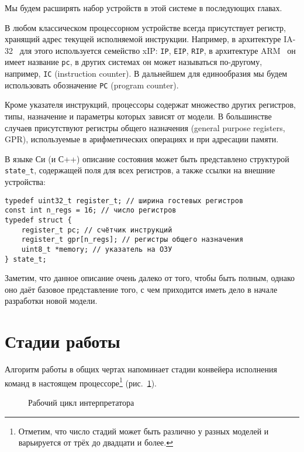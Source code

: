 Мы будем расширять набор устройств в этой системе в последующих главах.

В любом классическом процессорном устройстве всегда присутствует регистр, хранящий адрес текущей исполняемой инструкции. Например, в архитектуре IA-32~\cite{intelmanual2a} для этого используется семейство xIP: \texttt{IP}, \texttt{EIP}, \texttt{RIP}, в архитектуре ARM~\cite{arm-sdg} он имеет название \texttt{pc}, в других системах он может называться по-другому, например, \texttt{IC} (\abbr instruction counter). В дальнейшем для единообразия мы будем использовать обозначение \texttt{PC} (\abbr program counter).

Кроме указателя инструкций, процессоры содержат множество других регистров, типы, назначение и параметры которых зависят от модели. В большинстве случаев присутствуют регистры общего назначения (\abbr general purpose registers, GPR), используемые в арифметических операциях и при адресации памяти.

В языке Си (и С++) описание состояния может быть представлено структурой \texttt{state_t}, содержащей поля для всех регистров, а также ссылки на внешние устройства:

\begin{lstlisting}
typedef uint32_t register_t; // ширина гостевых регистров
const int n_regs = 16; // число регистров
typedef struct {
    register_t pc; // счётчик инструкций
    register_t gpr[n_regs]; // регистры общего назначения
    uint8_t *memory; // указатель на ОЗУ
} state_t;
\end{lstlisting}

Заметим, что данное описание очень далеко от того, чтобы быть полным, однако оно даёт базовое представление того, с чем приходится иметь дело в начале разработки новой модели.

\section{Стадии работы}
Алгоритм работы в общих чертах напоминает стадии конвейера исполнения команд в настоящем процессоре\footnote{Отметим, что число  стадий может быть различно у разных моделей и варьируется от трёх до двадцати и более.} (рис.~\ref{fig:interp-cycle-expanded}). 

\begin{figure}[htb]
    \centering
    \caption{Рабочий цикл интерпретатора}
    \label{fig:interp-cycle-expanded}
\end{figure}

